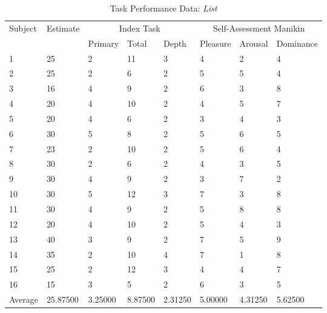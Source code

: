 \begin{table}[hbtp!]
\centering
\caption{Task Performance Data: \textit{List}} \vspace{0.3cm}
\label{tab:list}
\begin{tabular}{|llllllll|}
\hline
\multirow{2}{*}{Subject} & \multirow{2}{*}{Estimate} & \multicolumn{3}{|c|}{Index Task} & \multicolumn{3}{c|}{Self-Assessment Manikin} \\ \cline{3-8}
                         &                           & \multicolumn{1}{|l}{Primary}  & \multicolumn{1}{l}{Total} & \multicolumn{1}{l|}{Depth}   & Pleasure      & Arousal     & Dominance     \\ \hline\hline
1       & 25       & 2       & 11      & 3       & 4       & 2       & 4       \\
2       & 25       & 2       & 6       & 2       & 5       & 5       & 4       \\
3       & 16       & 4       & 9       & 2       & 6       & 3       & 8       \\
4       & 20       & 4       & 10      & 2       & 4       & 5       & 7       \\
5       & 20       & 4       & 6       & 2       & 3       & 4       & 3       \\
6       & 30       & 5       & 8       & 2       & 5       & 6       & 5       \\
7       & 23       & 2       & 10      & 2       & 5       & 6       & 4       \\
8       & 30       & 2       & 6       & 2       & 4       & 3       & 5       \\
9       & 30       & 4       & 9       & 2       & 3       & 7       & 2       \\
10      & 30       & 5       & 12      & 3       & 7       & 3       & 8       \\
11      & 30       & 4       & 9       & 2       & 5       & 8       & 8       \\
12      & 20       & 4       & 10      & 2       & 5       & 4       & 3       \\
13      & 40       & 3       & 9       & 2       & 7       & 5       & 9       \\
14      & 35       & 2       & 10      & 4       & 7       & 1       & 8       \\
15      & 25       & 2       & 12      & 3       & 4       & 4       & 7       \\
16      & 15       & 3       & 5       & 2       & 6       & 3       & 5       \\ \hline\hline    
Average & 25.87500 & 3.25000 & 8.87500 & 2.31250 & 5.00000 & 4.31250 & 5.62500 \\ \hline     
\end{tabular}
\end{table}

